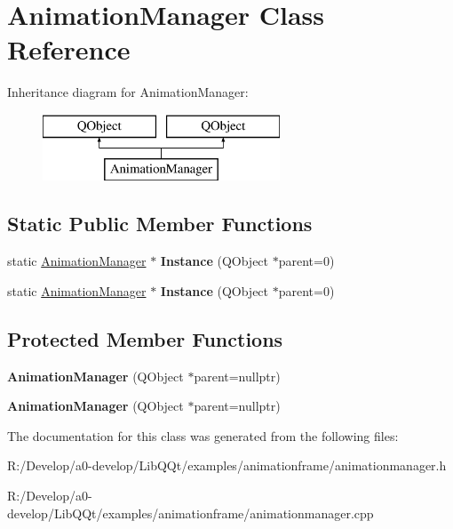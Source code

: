 \hypertarget{class_animation_manager}{}\section{Animation\+Manager Class Reference}
\label{class_animation_manager}
Inheritance diagram for Animation\+Manager\+:\begin{figure}[H]
\begin{center}
\leavevmode
\includegraphics[height=2.000000cm]{class_animation_manager}
\end{center}
\end{figure}
\subsection*{Static Public Member Functions}
\begin{DoxyCompactItemize}
\item 
\mbox{\label{class_animation_manager_aa2889150608d47ccfe6b8804edd44b5c}} 
static \mbox{\hyperlink{class_animation_manager}{Animation\+Manager}} $\ast$ {\bfseries Instance} (Q\+Object $\ast$parent=0)
\item 
\mbox{\label{class_animation_manager_a3940686f12e52656a22c05ca7eafd76d}} 
static \mbox{\hyperlink{class_animation_manager}{Animation\+Manager}} $\ast$ {\bfseries Instance} (Q\+Object $\ast$parent=0)
\end{DoxyCompactItemize}
\subsection*{Protected Member Functions}
\begin{DoxyCompactItemize}
\item 
\mbox{\label{class_animation_manager_acd56f63a333ca6c93de94eca16dde333}} 
{\bfseries Animation\+Manager} (Q\+Object $\ast$parent=nullptr)
\item 
\mbox{\label{class_animation_manager_acd56f63a333ca6c93de94eca16dde333}} 
{\bfseries Animation\+Manager} (Q\+Object $\ast$parent=nullptr)
\end{DoxyCompactItemize}


The documentation for this class was generated from the following files\+:\begin{DoxyCompactItemize}
\item 
R\+:/\+Develop/a0-\/develop/\+Lib\+Q\+Qt/examples/animationframe/animationmanager.\+h\item 
R\+:/\+Develop/a0-\/develop/\+Lib\+Q\+Qt/examples/animationframe/animationmanager.\+cpp\end{DoxyCompactItemize}
